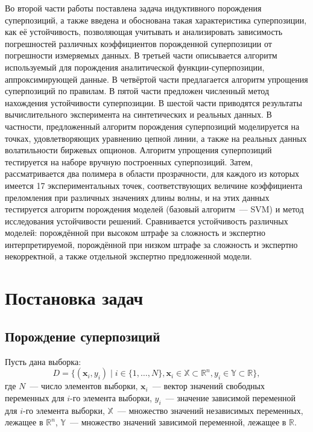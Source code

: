 \documentclass[12pt,a4paper]{article}
\begin{document}
Во второй части работы поставлена задача индуктивного порождения суперпозиций, а
также введена и обоснована такая характеристика суперпозиции, как её устойчивость,
позволяющая учитывать и анализировать зависимость погрешностей различных
коэффициентов порожденной суперпозиции от погрешности измеряемых данных.
В третьей части описывается алгоритм используемый для порождения аналитической
функции-суперпозиции, аппроксимирующей данные.
В четвёртой части предлагается алгоритм упрощения суперпозиций по правилам.
В пятой части предложен численный метод нахождения устойчивости суперпозиции.
В шестой части приводятся результаты вычислительного эксперимента на
синтетических и реальных данных. В частности, предложенный алгоритм порождения
суперпозиций моделируется на точках, удовлетворяющих уравнению цепной линии, а также
на реальных данных волатильности биржевых опционов. Алгоритм упрощения суперпозиций тестируется
на наборе вручную построенных суперпозиций. Затем, рассматривается два полимера
в области прозрачности, для каждого из которых имеется 17 экспериментальных точек,
соответствующих величине коэффициента преломления при различных значениях длины волны,
и на этих данных тестируется алгоритм порождения моделей (базовый алгоритм~--- SVM)
и метод исследования устойчивости решений. Сравнивается устойчивость различных
моделей: порождённой при высоком штрафе за сложность и экспертно интерпретируемой,
порождённой при низком штрафе за сложность и экспертно некорректной, а также
отдельной экспертно предложенной модели.

\section{Постановка задач}

\subsection{Порождение суперпозиций}

Пусть дана выборка:
\[
D = \{ (\mathbf{x}_i, y_i) \mid i \in \{1, \dots, N\},
			\mathbf{x}_i \in \mathbb{X} \subset \mathbb{R}^n,
			y_i \in \mathbb{Y} \subset \mathbb{R} \},
\]
где $N$~--- число элементов выборки, $\mathbf{x}_i$~--- вектор значений
свободных переменных для $i$-го элемента выборки, $y_i$~--- значение зависимой
переменной для $i$-го элемента выборки,
$\mathbb{X}$~--- множество значений независимых переменных, лежащее в
$\mathbb{R}^n$, $\mathbb{Y}$~--- множество значений зависимой переменной,
лежащее в $\mathbb{R}$.
\end{document}

